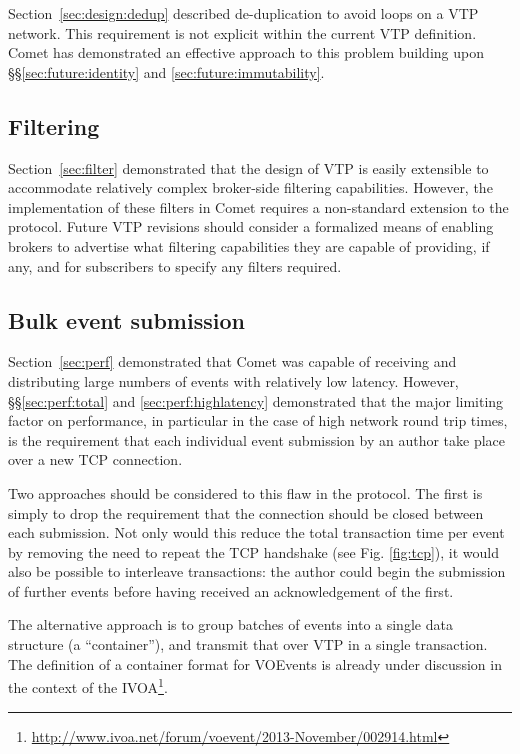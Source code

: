 \documentclass[5p,authoryear]{elsarticle}
\begin{document}
Section~\ref{sec:design:dedup} described de-duplication to avoid loops on a
VTP network. This requirement is not explicit within the current VTP
definition. Comet has demonstrated an effective approach to this problem
building upon \S\S\ref{sec:future:identity} and \ref{sec:future:immutability}.

\subsection{Filtering}
\label{sec:future:filter}

Section~\ref{sec:filter} demonstrated that the design of VTP is easily
extensible to accommodate relatively complex broker-side filtering
capabilities. However, the implementation of these filters in Comet requires a
non-standard extension to the protocol. Future VTP revisions should consider a
formalized means of enabling brokers to advertise what filtering capabilities
they are capable of providing, if any, and for subscribers to specify any
filters required.

\subsection{Bulk event submission}
\label{sec:future:bulk}

Section~\ref{sec:perf} demonstrated that Comet was capable of receiving and
distributing large numbers of events with relatively low latency. However,
\S\S\ref{sec:perf:total} and \ref{sec:perf:highlatency} demonstrated that
the major limiting factor on performance, in particular in the case of high
network round trip times, is the requirement that each individual event
submission by an author take place over a new TCP connection.

Two approaches should be considered to this flaw in the protocol. The first is
simply to drop the requirement that the connection should be closed between
each submission. Not only would this reduce the total transaction time per
event by removing the need to repeat the TCP handshake (see Fig.
\ref{fig:tcp}), it would also be possible to interleave transactions: the
author could begin the submission of further events before having received an
acknowledgement of the first.

The alternative approach is to group batches of events into a single data
structure (a ``container''), and transmit that over VTP in a single
transaction. The definition of a container format for VOEvents is already
under discussion in the context of the
IVOA\footnote{\url{http://www.ivoa.net/forum/voevent/2013-November/002914.html}}.
\end{document}
